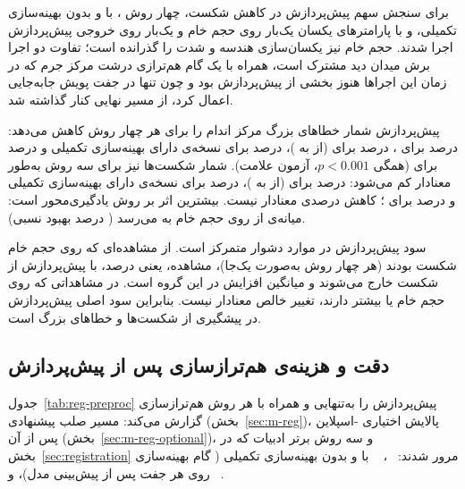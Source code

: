 برای سنجش سهم پیش‌پردازش در کاهش شکست، چهار روش ،  با و بدون بهینه‌سازی تکمیلی، و  با پارامترهای یکسان یک‌بار روی حجم خام و یک‌بار روی خروجی پیش‌پردازش اجرا شدند. حجم خام نیز یکسان‌سازی هندسه و شدت را گذرانده است؛ تفاوت دو اجرا برش میدان دید مشترک است، همراه با یک گام هم‌ترازی درشت مرکز جرم که در زمان این اجراها هنوز بخشی از پیش‌پردازش بود و چون تنها در  جفت پویش جابه‌جایی اعمال کرد، از مسیر نهایی کنار گذاشته شد.

پیش‌پردازش شمار خطاهای بزرگ مرکز اندام را برای هر چهار روش کاهش می‌دهد:  درصد برای ،  درصد برای  (از  به )،  درصد برای نسخه‌ی دارای بهینه‌سازی تکمیلی و  درصد برای  (همگی $p < 0.001$، آزمون علامت). شمار شکست‌ها نیز برای سه روش به‌طور معنادار کم می‌شود:  درصد برای  (از  به )،  درصد برای نسخه‌ی دارای بهینه‌سازی تکمیلی و  درصد برای ؛ کاهش  درصدی  معنادار نیست. بیشترین اثر بر روش یادگیری‌محور است: میانه‌ی   از  روی حجم خام به  می‌رسد ( درصد بهبود نسبی).

سود پیش‌پردازش در موارد دشوار متمرکز است. از  مشاهده‌ای که روی حجم خام شکست بودند (هر چهار روش به‌صورت یک‌جا)،  مشاهده، یعنی  درصد، با پیش‌پردازش از شکست خارج می‌شوند و میانگین افزایش  در این گروه  است. در مشاهداتی که روی حجم خام   یا بیشتر دارند، تغییر خالص معنادار نیست. بنابراین سود اصلی پیش‌پردازش در پیشگیری از شکست‌ها و خطاهای بزرگ است.

\subsection{دقت و هزینه‌ی هم‌ترازسازی پس از پیش‌پردازش}
\label{sec:e-reg-bspline}

جدول~\ref{tab:reg-preproc} پیش‌پردازش را به‌تنهایی و همراه با هر روش هم‌ترازسازی گزارش می‌کند: مسیر صلب پیشنهادی (بخش~\ref{sec:m-reg})، پالایش اختیاری -اسپلاین پس از آن (بخش~\ref{sec:m-reg-optional})، و سه روش برتر ادبیات که در بخش~\ref{sec:registration} مرور شدند: ~\cite{avants2008}، ~\cite{tian2023} با و بدون بهینه‌سازی تکمیلی ( گام بهینه‌سازی روی هر جفت پس از پیش‌بینی مدل)، و ~\cite{heinrich2013}.

